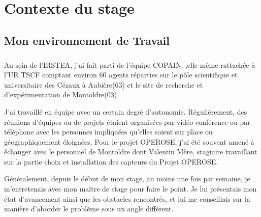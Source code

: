 \chapter{Contexte du stage}
\section{Mon environnement de Travail}
\paragraph{}
Au sein de l'IRSTEA, j'ai fait parti de l'équipe COPAIN, ,elle même rattachée à l'UR TSCF comptant environ 60 agents  réparties sur le pôle scientifique et universitaire des Cézaux à Aubière(63) et le site de recherche et d'expérimentation de Montoldre(03).

J'ai travaillé en équipe avec un certain degré d'autonomie. Régulièrement, des réunions d'équipes ou de projets étaient organisées par vidéo conférence ou par téléphone avec les personnes impliquées qu'elles soient sur place ou géographiquement éloignées. Pour le projet OPEROSE, j'ai été souvent amené à échanger avec le personnel de Montoldre dont Valentin Mère, stagiaire travaillant sur la partie choix et installation des capteurs du Projet OPEROSE.

Généralement, depuis le début de mon stage, au moins une fois par semaine, je m'entretenais avec mon maître de stage pour faire le point. Je lui présentais mon état d'avancement ainsi que les obstacles rencontrés, et lui me conseillais sur la manière d'aborder le problème sous un angle différent.

